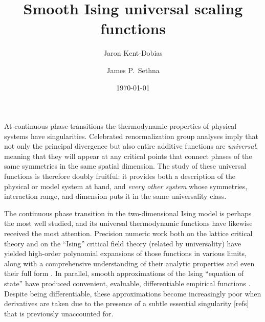 \documentclass[
  aps,
  pre,
  reprint,
  longbibliography,
  floatfix
]{revtex4-2}
\begin{document}
\title{Smooth Ising universal scaling functions}

\author{Jaron Kent-Dobias}

\author{James P.~Sethna}

\date\today

\begin{abstract}
\end{abstract}

\maketitle

At continuous phase transitions the thermodynamic properties of physical
systems have singularities. Celebrated renormalization group analyses imply
that not only the principal divergence but also entire additive functions are
\emph{universal}, meaning that they will appear at any critical points that
connect phases of the same symmetries in the same spatial dimension. The study
of these universal functions is therefore doubly fruitful: it provides both a
description of the physical or model system at hand, and \emph{every other
system} whose symmetries, interaction range, and dimension puts it in the same
universality class.

The continuous phase transition in the two-dimensional Ising model is perhaps
the most well studied, and its universal thermodynamic functions have likewise
received the most attention. Precision numeric work both on the lattice
critical theory and on the ``Ising'' critical field theory (related by
universality) have yielded high-order polynomial expansions of those functions
in various limits, along with a comprehensive understanding of their analytic
properties and even their full form \cite{Fonseca_2003_Ising, Mangazeev_2008_Variational, Mangazeev_2010_Scaling}. In parallel, smooth approximations of the
Ising ``equation of state'' have produced convenient, evaluable, differentiable
empirical functions \cite{Guida_1997_3D, Campostrini_2000_Critical, Caselle_2001_The}. Despite being differentiable, these approximations become
increasingly poor when derivatives are taken due to the presence of a subtle
essential singularity [refs] that is previously unaccounted for.
\end{document}
